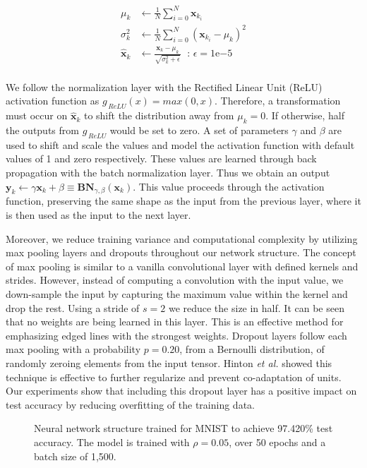 \documentclass[conference]{IEEEtran}
\newcommand{\xv}{\mathbf{x}}
\newcommand{\yv}{\mathbf{y}}
\newcommand{\Bv}{\mathbf{B}}
\newcommand{\Nv}{\mathbf{N}}
\begin{document}
\begin{align*}
    \mu_k &\leftarrow \frac{1}{N} \sum_{i=0}^N{\xv_{k_i}} \\
    \sigma^2_k &\leftarrow \frac{1}{N} \sum_{i=0}^N{(\xv_{k_i} - \mu_k)^2} \\
    \hat{\xv}_k &\leftarrow \frac{\xv_k - \mu_k}{\sqrt{\sigma^2_k + \epsilon}} \; 
    \text{ : } \epsilon = 1\mathrm{e}{-5}\\
\end{align*}

\noindent
We follow the normalization layer with the Rectified Linear Unit (ReLU) activation function as $g_{\,ReLU}(x) = max(0, x)$. Therefore, a transformation must occur on $\hat{\xv}_k$ to shift the distribution away from $\mu_k = 0$. If otherwise, half the outputs from $g_{\,ReLU}$ would be set to zero. A set of parameters $\gamma$ and $\beta$ are used to shift and scale the values and model the activation function with default values of 1 and zero respectively. These values are learned through back propagation with the batch normalization layer. Thus we obtain an output $\yv_k \leftarrow \gamma \xv_k + \beta \equiv \Bv\Nv_{\gamma, \beta}(\xv_k)$. This value proceeds through the activation function, preserving the same shape as the input from the previous layer, where it is then used as the input to the next layer.

Moreover, we reduce training variance and computational complexity by utilizing max pooling layers and dropouts throughout our network structure. The concept of max pooling is similar to a vanilla convolutional layer with defined kernels and strides. However, instead of computing a convolution with the input value, we down-sample the input by capturing the maximum value within the kernel and drop the rest. Using a stride of $s = 2$ we reduce the size in half. It can be seen that no weights are being learned in this layer. This is an effective method for emphasizing edged lines with the strongest weights. Dropout layers follow each max pooling with a probability $p = 0.20$, from a Bernoulli distribution, of randomly zeroing elements from the input tensor. Hinton {\it et al.} \cite{hinton2012improving} showed this technique is effective to further regularize and prevent co-adaptation of units. Our experiments show that including this dropout layer has a positive impact on test accuracy by reducing overfitting of the training data. 

\begin{figure}[!b]
	\centering
	
	\captionsetup{width=1\linewidth}
	\caption{Neural network structure trained for MNIST to achieve 97.420\% test accuracy. The model is trained with $\rho = 0.05$, over 50 epochs and a batch size of 1,500.}
	\label{fig:mnist_network_structure}
\end{figure}
\end{document}
